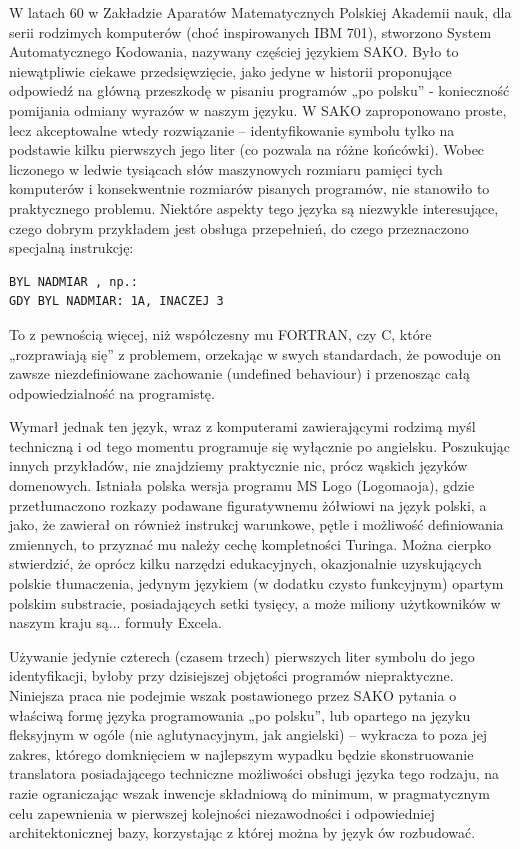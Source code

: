 W latach 60 w Zakładzie Aparatów Matematycznych Polskiej Akademii nauk, dla serii rodzimych komputerów (choć inspirowanych IBM 701), stworzono System Automatycznego Kodowania, nazywany częściej językiem SAKO.\cite{SAKO} Było to niewątpliwie ciekawe przedsięwzięcie, jako jedyne w historii proponujące odpowiedź na główną przeszkodę w pisaniu programów „po polsku” - konieczność pomijania odmiany wyrazów w naszym języku. W SAKO zaproponowano proste, lecz akceptowalne wtedy rozwiązanie – identyfikowanie symbolu tylko na podstawie kilku pierwszych jego liter (co pozwala na różne końcówki). Wobec liczonego w ledwie tysiącach słów maszynowych rozmiaru pamięci tych komputerów i konsekwentnie rozmiarów pisanych programów, nie stanowiło to praktycznego problemu.
Niektóre aspekty tego języka są niezwykle interesujące, czego dobrym przykładem jest obsługa przepełnień, do czego przeznaczono specjalną instrukcję:
\begin{lstlisting}
BYL NADMIAR , np.:
GDY BYL NADMIAR: 1A, INACZEJ 3 
\end{lstlisting}
To z pewnością więcej, niż współczesny mu FORTRAN, czy C, które „rozprawiają się” z problemem, orzekając w swych standardach, że powoduje on zawsze niezdefiniowane zachowanie (undefined behaviour) i przenosząc całą odpowiedzialność na programistę.

Wymarł jednak ten język, wraz z komputerami zawierającymi rodzimą myśl techniczną i od tego momentu programuje się wyłącznie po angielsku.
Poszukując innych przykładów, nie znajdziemy praktycznie nic, prócz wąskich języków domenowych. Istniała polska wersja programu MS Logo (Logomaoja), gdzie przetłumaczono rozkazy podawane figuratywnemu żółwiowi na język polski, a jako, że zawierał on również instrukcj warunkowe, pętle i możliwość definiowania zmiennych, to przyznać mu należy cechę kompletności Turinga. Można cierpko stwierdzić, że oprócz kilku narzędzi edukacyjnych, okazjonalnie uzyskujących polskie tłumaczenia, jedynym językiem (w dodatku czysto funkcyjnym) opartym polskim substracie, posiadających setki tysięcy, a może miliony użytkowników w naszym kraju są... formuły Excela.

Używanie jedynie czterech (czasem trzech) pierwszych liter symbolu do jego identyfikacji, byłoby przy dzisiejszej objętości programów niepraktyczne. Niniejsza praca nie podejmie wszak postawionego przez SAKO pytania o właściwą formę języka programowania „po polsku”, lub opartego na języku fleksyjnym w ogóle (nie aglutynacyjnym, jak angielski) – wykracza to poza jej zakres, którego domknięciem w najlepszym wypadku będzie skonstruowanie translatora posiadającego techniczne możliwości obsługi języka tego rodzaju, na razie ograniczając wszak inwencje składniową do minimum, w pragmatycznym celu zapewnienia w pierwszej kolejności niezawodności i odpowiedniej architektonicznej bazy, korzystając z której można by język ów rozbudować.

